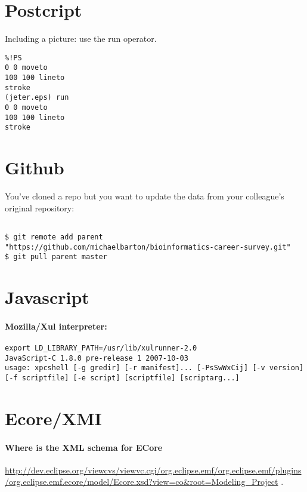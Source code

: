 \documentclass[12pt]{article}
\begin{document}
\section{Postcript}
Including a picture: use the run operator.
\begin{verbatim}
%!PS
0 0 moveto
100 100 lineto
stroke
(jeter.eps) run
0 0 moveto
100 100 lineto
stroke
\end{verbatim}
\section{Github}
You've cloned a repo but you want to update the data from your colleague's original repository:
\begin{verbatim}

$ git remote add parent "https://github.com/michaelbarton/bioinformatics-career-survey.git"
$ git pull parent master
\end{verbatim}
\section{Javascript}
\paragraph{Mozilla/Xul interpreter:}
\begin{verbatim}
export LD_LIBRARY_PATH=/usr/lib/xulrunner-2.0
JavaScript-C 1.8.0 pre-release 1 2007-10-03
usage: xpcshell [-g gredir] [-r manifest]... [-PsSwWxCij] [-v version] [-f scriptfile] [-e script] [scriptfile] [scriptarg...]
\end{verbatim}
\section{Ecore/XMI}
\paragraph{Where is the XML schema for ECore}
\url{http://dev.eclipse.org/viewcvs/viewvc.cgi/org.eclipse.emf/org.eclipse.emf/plugins/org.eclipse.emf.ecore/model/Ecore.xsd?view=co&root=Modeling_Project} .
\end{document}

